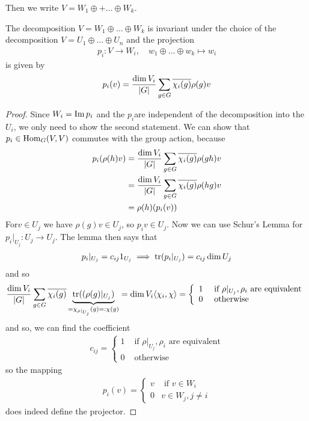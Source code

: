 Then we write $V = W_{1}\oplus + \ldots \oplus W_{k}$.
\begin{thm}[]
The decomposition $V = W_{1}\oplus \ldots \oplus W_{k}$ is invariant under the choice of the decomposition $V = U_{1}\oplus \ldots \oplus U_{n}$ and the projection
\begin{align*}
  p_i: V \to  W_i, \quad w_1 \oplus  \ldots \oplus w_k \mapsto  w_i
\end{align*}
is given by
\begin{align*}
  p_i(v) = \frac{\dim V_i}{\vert G\vert} \sum_{g \in G}\overline{\chi_i(g)} \rho(g) v
\end{align*}
\end{thm}
\begin{proof}
Since $W_i = \operatorname{Im} p_i$ and the $p_i$are independent of the decomposition into the $U_i$, we only need to show the second statement.
We can show that $p_i \in \operatorname{Hom}_G(V,V)$ commutes with the group action, because
\begin{align*}
  p_i(\rho(h)v) 
  &= \frac{\dim V_i}{\vert G\vert} \sum_{g \in G}\overline{\chi_i(g)}\rho(gh) v\\
  &=
  \frac{\dim V_i}{\vert G\vert} \sum_{g \in G}\overline{\chi_i(g)} \rho(hg)v\\
  &= \rho(h) (p_i(v))
\end{align*}
For$v \in U_j$ we have $\rho(g)v \in U_j$, so $p_iv \in U_j$.
Now we can use Schur's Lemma for $p_i|_{U_j}: U_j \to  U_j$. 
The lemma then says that
\begin{align*}
  p_i|_{U_j} = c_{ij}1_{U_j}
  \implies
  \operatorname{tr}(p_i|_{U_j}) = c_{ij} \dim U_j
\end{align*}
and so
\begin{align*}
  \frac{\dim V_i}{\vert G\vert} \sum_{g \in G} \overline{\chi_{i}(g)} \underbrace{\operatorname{tr}((\rho(g)|_{U_j})}_{= \chi_{\rho|_{U_j}}(g) =: \chi(g)} = \dim V_i \langle\chi_i,\chi\rangle = \left\{\begin{array}{ll}
    1 & \text{ if } \rho|_{U_j}, \rho_i \text{ are equivalent}\\
    0 &  \text{ otherwise}
  \end{array} \right.
\end{align*}
and so, we can find the coefficient
\begin{align*}
  c_{ij} = \left\{\begin{array}{ll}
    1 & \text{ if } \rho|_{U_j}, \rho_i \text{ are equivalent}\\
     0&  \text{ otherwise}
  \end{array} \right.
\end{align*}
so the mapping
\begin{align*}
  p_i(v) = \left\{\begin{array}{ll}
    v & \text{ if }v\in W_i\\
     0 & v \in W_j, j \neq i
  \end{array} \right.
\end{align*}
does indeed define the projector.

\end{proof}




